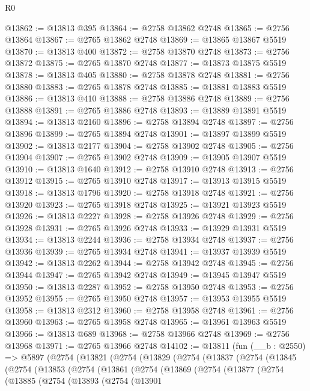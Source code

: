 \begin{lexlean}{R0}
\begin{coremodule}
@13862 := @13813 @395
@13864 := @2758 @13862 @2748
@13865 := @2756 @13864
@13867 := @2765 @13862 @2748
@13869 := @13865 @13867 @5519
@13870 := @13813 @400
@13872 := @2758 @13870 @2748
@13873 := @2756 @13872
@13875 := @2765 @13870 @2748
@13877 := @13873 @13875 @5519
@13878 := @13813 @405
@13880 := @2758 @13878 @2748
@13881 := @2756 @13880
@13883 := @2765 @13878 @2748
@13885 := @13881 @13883 @5519
@13886 := @13813 @410
@13888 := @2758 @13886 @2748
@13889 := @2756 @13888
@13891 := @2765 @13886 @2748
@13893 := @13889 @13891 @5519
@13894 := @13813 @2160
@13896 := @2758 @13894 @2748
@13897 := @2756 @13896
@13899 := @2765 @13894 @2748
@13901 := @13897 @13899 @5519
@13902 := @13813 @2177
@13904 := @2758 @13902 @2748
@13905 := @2756 @13904
@13907 := @2765 @13902 @2748
@13909 := @13905 @13907 @5519
@13910 := @13813 @1640
@13912 := @2758 @13910 @2748
@13913 := @2756 @13912
@13915 := @2765 @13910 @2748
@13917 := @13913 @13915 @5519
@13918 := @13813 @1796
@13920 := @2758 @13918 @2748
@13921 := @2756 @13920
@13923 := @2765 @13918 @2748
@13925 := @13921 @13923 @5519
@13926 := @13813 @2227
@13928 := @2758 @13926 @2748
@13929 := @2756 @13928
@13931 := @2765 @13926 @2748
@13933 := @13929 @13931 @5519
@13934 := @13813 @2244
@13936 := @2758 @13934 @2748
@13937 := @2756 @13936
@13939 := @2765 @13934 @2748
@13941 := @13937 @13939 @5519
@13942 := @13813 @2262
@13944 := @2758 @13942 @2748
@13945 := @2756 @13944
@13947 := @2765 @13942 @2748
@13949 := @13945 @13947 @5519
@13950 := @13813 @2287
@13952 := @2758 @13950 @2748
@13953 := @2756 @13952
@13955 := @2765 @13950 @2748
@13957 := @13953 @13955 @5519
@13958 := @13813 @2312
@13960 := @2758 @13958 @2748
@13961 := @2756 @13960
@13963 := @2765 @13958 @2748
@13965 := @13961 @13963 @5519
@13966 := @13813 @689
@13968 := @2758 @13966 @2748
@13969 := @2756 @13968
@13971 := @2765 @13966 @2748
@14102 := @13811
    (fun (__b : @2550) =>
    @5897
      (@2754
        (@13821
          (@2754
            (@13829
              (@2754
                (@13837
                  (@2754
                    (@13845
                      (@2754
                        (@13853
                          (@2754
                            (@13861
                              (@2754
                                (@13869
                                  (@2754
                                    (@13877
                                      (@2754
                                        (@13885
                                          (@2754
                                            (@13893
                                              (@2754
                                                (@13901

\end{coremodule}
\end{lexlean}
